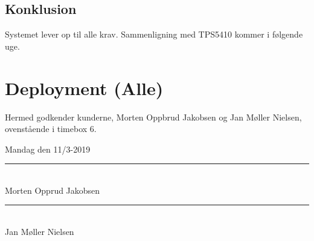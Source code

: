 \subsection{Konklusion}
\label{sec:konklusion-1}

Systemet lever op til alle krav. Sammenligning med TPS5410 kommer i følgende uge.

\section{Deployment (Alle)}
\label{sec:deployment}

Hermed godkender kunderne, Morten Oppbrud Jakobsen og Jan Møller Nielsen, ovenstående i timebox 6.

Mandag den 11/3-2019

\begin{minipage}{.5\textwidth}
  \begin{center}
    \vspace{1.4cm}
    \rule{0.8\textwidth}{0.1pt}\\
    \small{Morten Opprud Jakobsen\\%
    }
  \end{center}
\end{minipage}%
\begin{minipage}{0.5\textwidth}
  \begin{center}
    \vspace{1.4cm}
    \rule{0.8\textwidth}{0.1pt}\\
    \small{Jan Møller Nielsen\\%
    }
  \end{center}
\end{minipage}

